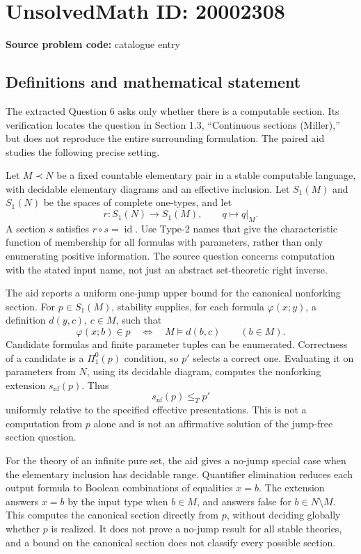 \documentclass[11pt]{article}
\begin{document}
\section*{UnsolvedMath ID: 20002308}
\textbf{Source problem code:} catalogue entry
\subsection{Definitions and mathematical statement}
The extracted Question 6 asks only whether there is a computable section. Its verification locates the question in Section 1.3, ``Continuous sections (Miller),'' but does not reproduce the entire surrounding formulation. The paired aid studies the following precise setting.

Let \(M\prec N\) be a fixed countable elementary pair in a stable computable language, with decidable elementary diagrams and an effective inclusion. Let \(S_1(M)\) and \(S_1(N)\) be the spaces of complete one-types, and let
\[
 r:S_1(N)\to S_1(M),\qquad q\mapsto q|_M.
\]
A section \(s\) satisfies \(r\circ s=\operatorname{id}\). Use Type-2 names that give the characteristic function of membership for all formulas with parameters, rather than only enumerating positive information. The source question concerns computation with the stated input name, not just an abstract set-theoretic right inverse.

The aid reports a uniform one-jump upper bound for the canonical nonforking section. For \(p\in S_1(M)\), stability supplies, for each formula \(\varphi(x;y)\), a definition \(d(y,c)\), \(c\in M\), such that
\[
 \varphi(x;b)\in p\quad\Longleftrightarrow\quad
 M\models d(b,c)\qquad(b\in M).
\]
Candidate formulas and finite parameter tuples can be enumerated. Correctness of a candidate is a \(\Pi^0_1(p)\) condition, so \(p'\) selects a correct one. Evaluating it on parameters from \(N\), using its decidable diagram, computes the nonforking extension \(s_{\mathrm{nf}}(p)\). Thus
\[
 s_{\mathrm{nf}}(p)\leq_T p'
\]
uniformly relative to the specified effective presentations. This is not a computation from \(p\) alone and is not an affirmative solution of the jump-free section question.

For the theory of an infinite pure set, the aid gives a no-jump special case when the elementary inclusion has decidable range. Quantifier elimination reduces each output formula to Boolean combinations of equalities \(x=b\). The extension answers \(x=b\) by the input type when \(b\in M\), and answers false for \(b\in N\setminus M\). This computes the canonical section directly from \(p\), without deciding globally whether \(p\) is realized. It does not prove a no-jump result for all stable theories, and a bound on the canonical section does not classify every possible section.
\end{document}

